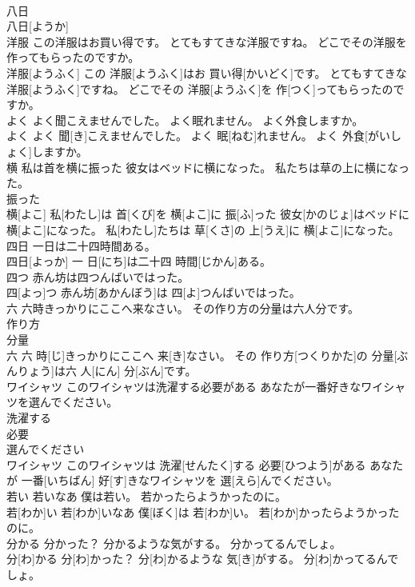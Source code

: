 \documentclass[8pt]{extreport}
\begin{document}
\begin{CJK}{UTF8}{min}
\\	八日	
\\	八日[ようか]
\\	洋服 この洋服はお買い得です。 とてもすてきな洋服ですね。 どこでその洋服を作ってもらったのですか。	
\\	洋服[ようふく] この 洋服[ようふく]はお 買い得[かいどく]です。 とてもすてきな 洋服[ようふく]ですね。 どこでその 洋服[ようふく]を 作[つく]ってもらったのですか。
\\	よく よく聞こえませんでした。 よく眠れません。 よく外食しますか。	
\\	よく よく 聞[き]こえませんでした。 よく 眠[ねむ]れません。 よく 外食[がいしょく]しますか。
\\	横 私は首を横に振った 彼女はベッドに横になった。 私たちは草の上に横になった。	
\\	振った 
\\	横[よこ] 私[わたし]は 首[くび]を 横[よこ]に 振[ふ]った 彼女[かのじょ]はベッドに 横[よこ]になった。 私[わたし]たちは 草[くさ]の 上[うえ]に 横[よこ]になった。
\\	四日 一日は二十四時間ある。	
\\	四日[よっか] 一 日[にち]は二十四 時間[じかん]ある。
\\	四つ 赤ん坊は四つんばいではった。	
\\	四[よっ]つ 赤ん坊[あかんぼう]は 四[よ]つんばいではった。
\\	六 六時きっかりにここへ来なさい。 その作り方の分量は六人分です。	
\\	作り方 
\\	分量 
\\	六 六 時[じ]きっかりにここへ 来[き]なさい。 その 作り方[つくりかた]の 分量[ぶんりょう]は六 人[にん] 分[ぶん]です。
\\	ワイシャツ このワイシャツは洗濯する必要がある あなたが一番好きなワイシャツを選んでください。	
\\	洗濯する 
\\	必要 
\\	選んでください 
\\	ワイシャツ このワイシャツは 洗濯[せんたく]する 必要[ひつよう]がある あなたが 一番[いちばん] 好[す]きなワイシャツを 選[えら]んでください。
\\	若い 若いなあ 僕は若い。 若かったらようかったのに。	
\\	若[わか]い 若[わか]いなあ 僕[ぼく]は 若[わか]い。 若[わか]かったらようかったのに。
\\	分かる 分かった？ 分かるような気がする。 分かってるんでしょ。	
\\	分[わ]かる 分[わ]かった？ 分[わ]かるような 気[き]がする。 分[わ]かってるんでしょ。

\end{CJK}
\end{document}
